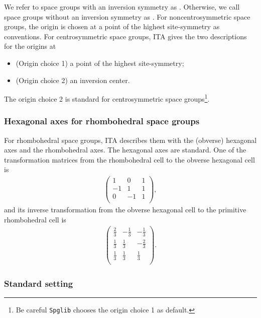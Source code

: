 We refer to space groups with an inversion symmetry as .
Otherwise, we call space groups without an inversion symmetry as .
For noncentrosymmetric space groups, the origin is chosen at a point of the highest site-symmetry as conventions.
For centrosymmetric space groups, ITA gives the two descriptions for the origins at
\begin{itemize}
  \item (Origin choice 1) a point of the highest site-symmetry;
  \item (Origin choice 2) an inversion center.
\end{itemize}
The origin choice 2 is standard for centrosymmetric space groups\footnote{
  Be careful \texttt{Spglib} chooses the origin choice 1 as default.
}.

\subsubsection{Hexagonal axes for rhombohedral space groups}

For rhombohedral space groups, ITA describes them with the (obverse) hexagonal axes and the rhombohedral axes.
The hexagonal axes are standard.
One of the transformation matrices from the rhombohedral cell to the obverse hexagonal cell is
\begin{align*}
  \begin{pmatrix}
    1 & 0 & 1 \\
    -1 & 1 & 1 \\
    0 & -1 & 1 \\
  \end{pmatrix},
\end{align*}
and its inverse transformation from the obverse hexagonal cell to the primitive rhombohedral cell is
\begin{align*}
  \begin{pmatrix}
    \frac{2}{3} & -\frac{1}{3} & -\frac{1}{3} \\
    \frac{1}{3} & \frac{1}{3} & -\frac{2}{3} \\
    \frac{1}{3} & \frac{1}{3} & \frac{1}{3} \\
  \end{pmatrix}.
\end{align*}

\subsubsection{Standard setting}

